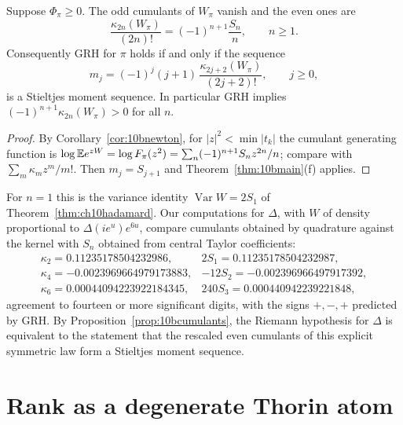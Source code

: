 \begin{proposition}\label{prop:10bcumulants}
Suppose $\Phi_\pi\ge0$. The odd cumulants of $W_\pi$ vanish and the even ones are
\[
\frac{\kappa_{2n}(W_\pi)}{(2n)!} = (-1)^{n+1}\frac{S_n}n,\qquad n\ge1 .
\]
Consequently GRH for $\pi$ holds if and only if the sequence
\[
m_j = (-1)^j(j+1)\,\frac{\kappa_{2j+2}(W_\pi)}{(2j+2)!},\qquad j\ge0,
\]
is a Stieltjes moment sequence. In particular GRH implies $(-1)^{n+1}\kappa_{2n}(W_\pi)>0$ for all $n$.
\end{proposition}

\begin{proof}
By Corollary~\ref{cor:10bnewton}, for $|z|^2<\min|t_k|$ the cumulant generating function is $\log\mathbb{E} e^{zW} = \log F_\pi(z^2) = \sum_n(-1)^{n+1}S_nz^{2n}/n$; compare with $\sum_m\kappa_mz^m/m!$. Then $m_j = S_{j+1}$ and Theorem~\ref{thm:10bmain}(f) applies.
\end{proof}

For $n=1$ this is the variance identity $\operatorname{Var}W = 2S_1$ of Theorem~\ref{thm:ch10hadamard}. Our computations for $\Delta$, with $W$ of density proportional to $\Delta(ie^u)e^{6u}$, compare cumulants obtained by quadrature against the kernel with $S_n$ obtained from central Taylor coefficients:
\[
\begin{array}{lll}
\kappa_2 = 0.11235178504232986, & 2S_1 = 0.11235178504232987,\\
\kappa_4 = -0.0023969664979173883, & -12S_2 = -0.002396966497917392,\\
\kappa_6 = 0.00044094223922184345, & 240S_3 = 0.000440942239221848,
\end{array}
\]
agreement to fourteen or more significant digits, with the signs $+,-,+$ predicted by GRH. By Proposition~\ref{prop:10bcumulants}, the Riemann hypothesis for $\Delta$ is equivalent to the statement that the rescaled even cumulants of this explicit symmetric law form a Stieltjes moment sequence.

\section{Rank as a degenerate Thorin atom}

